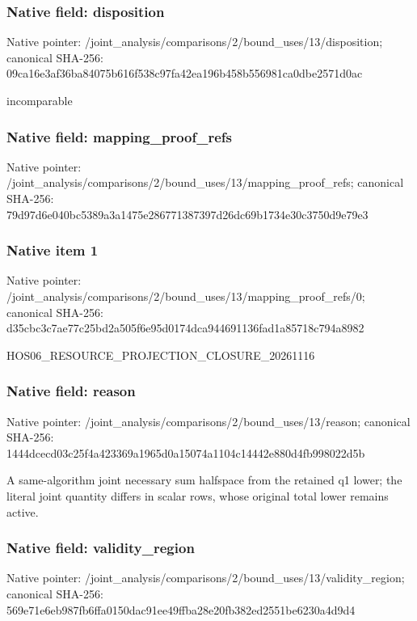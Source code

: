 \documentclass[10pt,a4paper]{article}
\begin{document}
\subsubsection{Native field: disposition}
Native pointer: /joint\_\allowbreak{}analysis/comparisons/2/bound\_\allowbreak{}uses/13/disposition; canonical SHA-256: 09ca16e3af36ba84075b616f538c97fa42ea196b458b556981ca0dbe2571d0ac

\begingroup\raggedright\sloppy incomparable\par\endgroup

\subsubsection{Native field: mapping\_\allowbreak{}proof\_\allowbreak{}refs}
Native pointer: /joint\_\allowbreak{}analysis/comparisons/2/bound\_\allowbreak{}uses/13/mapping\_\allowbreak{}proof\_\allowbreak{}refs; canonical SHA-256: 79d97d6e040bc5389a3a1475e286771387397d26dc69b1734e30c3750d9e79e3

\subsubsection{Native item 1}
Native pointer: /joint\_\allowbreak{}analysis/comparisons/2/bound\_\allowbreak{}uses/13/mapping\_\allowbreak{}proof\_\allowbreak{}refs/0; canonical SHA-256: d35cbc3c7ae77c25bd2a505f6e95d0174dca944691136fad1a85718c794a8982

\begingroup\raggedright\sloppy HOS06\_\allowbreak{}RESOURCE\_\allowbreak{}PROJECTION\_\allowbreak{}CLOSURE\_\allowbreak{}20261116\par\endgroup

\subsubsection{Native field: reason}
Native pointer: /joint\_\allowbreak{}analysis/comparisons/2/bound\_\allowbreak{}uses/13/reason; canonical SHA-256: 1444dcecd03c25f4a423369a1965d0a15074a1104c14442e880d4fb998022d5b

\begingroup\raggedright\sloppy A same-algorithm joint necessary sum halfspace from the retained q1 lower;\allowbreak{} the literal joint quantity differs in scalar rows,\allowbreak{} whose original total lower remains active.\par\endgroup

\subsubsection{Native field: validity\_\allowbreak{}region}
Native pointer: /joint\_\allowbreak{}analysis/comparisons/2/bound\_\allowbreak{}uses/13/validity\_\allowbreak{}region; canonical SHA-256: 569e71e6eb987fb6ffa0150dac91ee49ffba28e20fb382ed2551be6230a4d9d4
\end{document}
